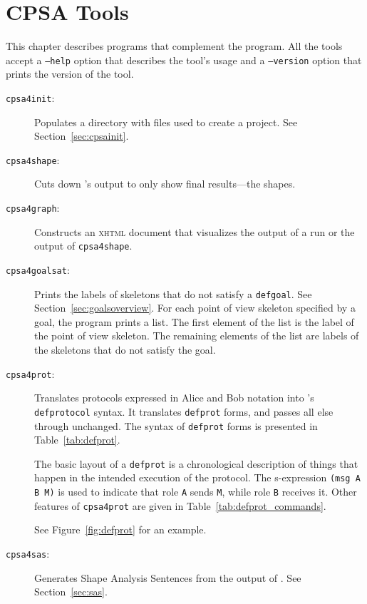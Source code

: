 \chapter{CPSA Tools}
\label{ch:tools}

This chapter describes programs that complement the {\cpsa} program.
All the tools accept a \texttt{--help} option that describes the
tool's usage and a \texttt{--version} option that prints the version
of the tool.

\begin{description}
\item[\texttt{cpsa4init}:] Populates a directory with files used to
  create a {\cpsa} project.  See Section~\ref{sec:cpsainit}.

\item[\texttt{cpsa4shape}:] Cuts down {\cpsa}'s output to only show
  final results---the shapes.

\item[\texttt{cpsa4graph}:] Constructs an \textsc{xhtml} document that
  visualizes the output of a {\cpsa} run or the output of
  \texttt{cpsa4shape}.

\item[\texttt{cpsa4goalsat}:]  Prints the labels of skeletons that do
  not satisfy a \texttt{defgoal}.  See
  Section~\ref{sec:goalsoverview}.  For each point of view skeleton
  specified by a goal, the program prints a list.  The first element
  of the list is the label of the point of view skeleton.  The
  remaining elements of the list are labels of the skeletons that do
  not satisfy the goal.

\item[\texttt{cpsa4prot}:] Translates protocols expressed in Alice and
  Bob notation into {\cpsa}'s \texttt{defprotocol} syntax.  It
  translates \texttt{defprot} forms, and passes all else through
  unchanged.  The syntax of \texttt{defprot} forms is presented in
  Table~\ref{tab:defprot}.

  The basic layout of a \texttt{defprot} is a chronological
  description of things that happen in the intended execution of the
  protocol.  The s-expression \texttt{(msg A B M)} is used to indicate
  that role \texttt{A} sends \texttt{M}, while role \texttt{B}
  receives it.  Other features of \texttt{cpsa4prot} are given in Table~\ref{tab:defprot_commands}.

  See Figure~\ref{fig:defprot} for an
  example.

\item[\texttt{cpsa4sas}:]  Generates Shape Analysis Sentences from the
  output of {\cpsa}.  See Section~\ref{sec:sas}.


\end{description}
